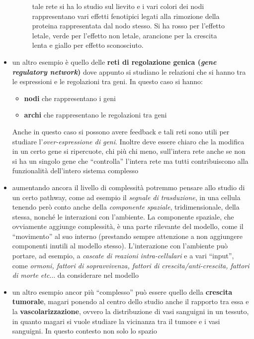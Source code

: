 \documentclass[a4paper,12pt, oneside]{book}
\begin{document}
\begin{itemize}
\begin{figure}
{    tale rete si ha lo studio sul lievito e i vari colori dei nodi rappresentano
    vari effetti fenotipici legati alla rimozione della proteina rappresentata
    dal nodo stesso. Si ha rosso per l'effetto letale, verde per l'effetto non
    letale, arancione per la crescita lenta e giallo per effetto sconosciuto.}
     \label{fig:ppn}
  \end{figure}
  \item un altro esempio è quello delle \textbf{reti di regolazione genica
    (\textit{gene regulatory network})} dove appunto si studiano le relazioni
  che si hanno tra le espressioni e le regolazioni tra geni. In questo caso si
  hanno: 
  \begin{itemize}
    \item \textbf{nodi} che rappresentano i geni
    \item \textbf{archi} che rappresentano le regolazioni tra geni
  \end{itemize}
  Anche in questo caso si possono avere feedback e tali reti sono utili per
  studiare l'\textit{over-espressione di geni}. Inoltre deve essere chiaro che
  la modifica in un certo gene si ripercuote, chi più chi meno, sull'intera
  rete anche se non si ha un singolo gene che ``controlla'' l'intera rete ma
  tutti contribuiscono alla funzionalità dell'intero sistema complesso
  \item aumentando ancora il livello di complessità potremmo pensare allo studio
  di un certo pathway, come ad esempio il \textit{segnale di trasduzione}, in
  una cellula tenendo però conto anche della \textit{componente spaziale},
  tridimensionale, della stessa,  
  nonché le interazioni con l'ambiente. La componente spaziale, che ovviamente
  aggiunge complessità, è una parte rilevante del modello, come il ``movimento''
  al suo interno (prestando sempre attenzione a non aggiungere componenti
  inutili al modello stesso). L'interazione con l'ambiente può portare, ad
  esempio, a \textit{cascate di reazioni intra-cellulari} e a vari ``input'',
  come \textit{ormoni, fattori di sopravvivenza, fattori di
    crescita/anti-crescita, fattori di morte etc$\ldots$} da considerare nel
  modello 
  \item un altro esempio ancor più ``complesso'' può essere quello della
  \textbf{crescita tumorale}, magari ponendo al centro dello studio anche il
  rapporto tra essa e la \textbf{vascolarizzazione}, ovvero la distribuzione di
  vasi sanguigni in un tessuto, in quanto magari si vuole studiare la vicinanza
  tra il tumore e i vasi sanguigni. In questo contesto non solo lo spazio

\end{itemize}
\end{document}
